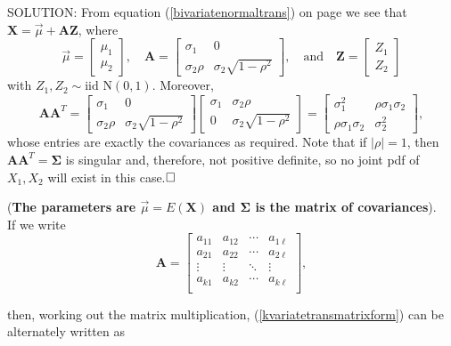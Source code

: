 \documentclass[12pt]{article}
\begin{document}
\noindent SOLUTION:  From equation (\ref{bivariatenormaltrans}) on page \pageref{bivariatenormaltrans} we see that $\mathbf{X}=\vec{\mu}+\mathbf{AZ}$, where
$$\vec{\mu}=\left[ \begin{array}{c} \mu_1\\ \mu_2 \end{array}\right],\quad \mathbf{A} = \left[ \begin{array}{cc} \sigma_1 & 0 \\ \sigma_2\rho & \sigma_2\sqrt{1-\rho^2} \end{array}\right], \quad\mbox{and}\quad \mathbf{Z} = \left[ \begin{array}{c} Z_1\\ Z_2 \end{array}\right]$$
with $Z_1,Z_2\sim \mbox{iid N}(0,1)$.
Moreover,
$$\mathbf{AA}^T =
\left[
\begin{array}{cc} \sigma_1 & 0 \\ \sigma_2\rho & \sigma_2\sqrt{1-\rho^2} \end{array}
\right]
\left[
\begin{array}{cc} \sigma_1 & \sigma_2\rho \\ 0 & \sigma_2\sqrt{1-\rho^2} \end{array}
\right] =
\left[
\begin{array}{cc} \sigma_1^2 & \rho\sigma_1\sigma_2 \\ \rho\sigma_1\sigma_2 & \sigma_2^2 \end{array}
\right],$$
whose entries are exactly the covariances as required.  Note that if $|\rho|=1$, then $\mathbf{AA}^T=\mathbf{\Sigma}$ is singular and, therefore, not positive definite, so no joint pdf of $X_1,X_2$ will exist in this case.$\hfill\Box$


\newpage

 ({\bf The parameters are $\vec{\mu}=E(\mathbf{X})$ and $\mathbf{\Sigma}$ is the matrix of covariances}).\\
\noindent If we write
$$\mathbf{A} = \left[ \begin{array}{cccc} a_{11} & a_{12} & \cdots & a_{1\ell} \\ a_{21} & a_{22} & \cdots & a_{2\ell} \\
\vdots & \vdots & \ddots & \vdots \\
a_{k1} & a_{k2} & \cdots & a_{k\ell} \\ \end{array} \right],$$

\bigskip
\noindent then, working out the matrix multiplication, (\ref{kvariatetransmatrixform}) can be alternately written as
\end{document}
